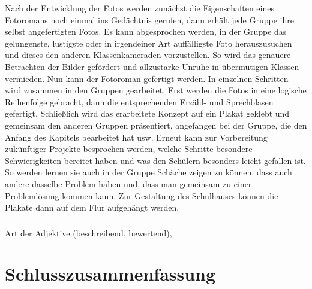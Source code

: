 {Nach der Entwicklung der Fotos werden zunächst die Eigenschaften eines Fotoromans noch einmal ins Gedächtnis gerufen, dann erhält jede Gruppe ihre selbst angefertigten Fotos. Es kann abgesprochen werden, in der Gruppe das gelungenste, lustigste oder in irgendeiner Art auffälligste Foto herauszusuchen und dieses den anderen Klassenkameraden vorzustellen. So wird das genauere Betrachten der Bilder gefördert und allzustarke Unruhe in übermütigen Klassen vermieden. Nun kann der Fotoroman gefertigt werden. In einzelnen Schritten wird zusammen in den Gruppen gearbeitet. Erst werden die Fotos in eine logische Reihenfolge gebracht, dann die entsprechenden Erzähl- und Sprechblasen gefertigt. Schließlich wird das erarbeitete Konzept auf ein Plakat geklebt und gemeinsam den anderen Gruppen präsentiert, angefangen bei der Gruppe, die den Anfang des Kapitels bearbeitet hat usw. Erneut kann zur Vorbereitung zukünftiger Projekte besprochen werden, welche Schritte besondere Schwierigkeiten bereitet haben und was den Schülern besonders leicht gefallen ist. So werden lernen sie auch in der Gruppe Schäche zeigen zu können, dass auch andere dasselbe Problem haben und, dass man gemeinsam zu einer Problemlösung kommen kann. Zur Gestaltung des Schulhauses können die Plakate dann auf dem Flur aufgehängt werden.


\subsection{   }
Art der Adjektive (beschreibend, bewertend),

\chapter{Schlusszusammenfassung}

}

